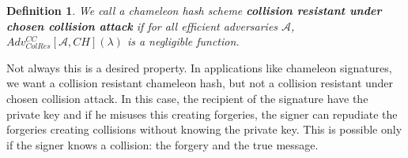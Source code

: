 \documentclass[a4paper]{article}
\newtheorem{definicao}{Definition}
\begin{document}
    \begin{definicao}
    We call a chameleon hash scheme \textbf{collision resistant under
    chosen collision attack} 
    if for all efficient adversaries $\mathcal{A}$,
    $Adv_{ColRes}^{CC}[\mathcal{A},CH](\lambda)$ is a negligible function.
    \end{definicao}
    
    Not always this is a desired property. In applications like chameleon
    signatures, we want a collision resistant chameleon hash, but not a
    collision resistant under chosen collision attack. In this case,
    the recipient of the signature have the private key and if he misuses
    this creating forgeries, the signer can repudiate the forgeries
    creating collisions without knowing the private key. This is possible
    only if the signer knows a collision: the forgery and the true message.
    
\end{document}
